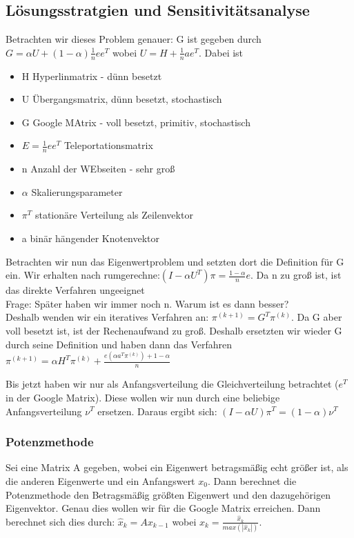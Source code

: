 \documentclass[]{article}
\begin{document}
 \subsection{Lösungsstratgien und Sensitivitätsanalyse}   
 
Betrachten wir dieses Problem genauer: G ist gegeben durch $G= \alpha U + (1 - \alpha ) \frac{1}{n} e e^T$ wobei $U=H+\frac{1}{n}a e^T$. Dabei ist 
\begin{itemize}
	\item H Hyperlinmatrix - dünn besetzt
	\item U Übergangsmatrix, dünn besetzt, stochastisch
	\item G Google MAtrix - voll besetzt, primitiv, stochastisch
	\item $E=\frac{1}{n}ee^T$ Teleportationsmatrix
	\item n Anzahl der WEbseiten - sehr groß
	\item $\alpha$ Skalierungsparameter
	\item $\pi^T$ stationäre Verteilung als Zeilenvektor
	\item a binär hängender Knotenvektor
\end{itemize}

Betrachten wir nun das Eigenwertproblem und setzten dort die Definition für G ein. Wir erhalten nach rumgerechne:$(I- \alpha U^T) \pi = \frac{1 - \alpha}{n}e$. Da n zu groß ist, ist das direkte Verfahren ungeeignet \\

Frage: Später haben wir immer noch n. Warum ist es dann besser? \\

Deshalb wenden wir ein iteratives Verfahren an: $\pi^{(k+1)} = G^T \pi^{(k)}$. Da G aber voll besetzt ist, ist der Rechenaufwand zu groß. Deshalb ersetzten wir wieder G durch seine Definition und haben dann das Verfahren $\pi^{(k+1)}=\alpha H^T \pi^{(k)} + \frac{e(\alpha a^T \pi^{(k)}) + 1 - \alpha}{n}$ 

Bis jetzt haben wir nur als Anfangsverteilung die Gleichverteilung betrachtet ($e^T$ in der Google Matrix). Diese wollen wir nun durch eine beliebige Anfangsverteilung $\nu^T$ ersetzen. Daraus ergibt sich: $(I- \alpha U) \pi^T = (1-\alpha)\nu^T$ 

\subsubsection*{Potenzmethode} 

Sei eine Matrix A gegeben, wobei ein Eigenwert betragsmäßig echt größer ist, als die anderen Eigenwerte und ein Anfangswert $x_0$. Dann berechnet die Potenzmethode den Betragsmäßig größten Eigenwert und den dazugehörigen Eigenvektor. Genau dies wollen wir für die Google Matrix erreichen. Dann berechnet sich dies durch: $\hat{x}_k=A x_{k-1}$ wobei $x_k = \frac{\hat{x}_k}{max(|\hat{x}_k|)}$.
\end{document}
